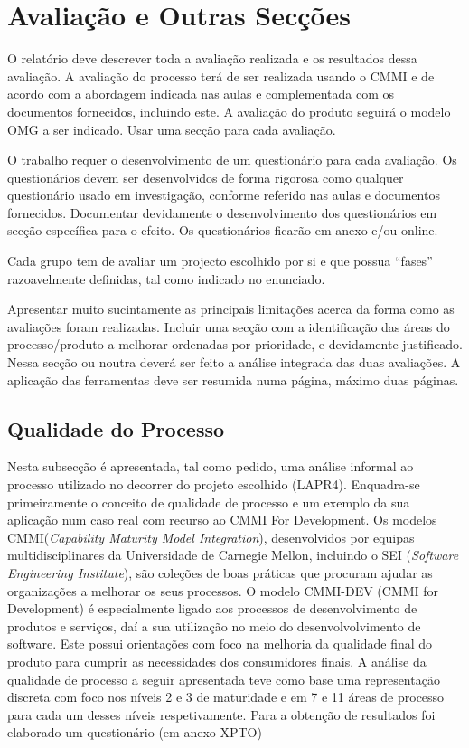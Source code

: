 \documentclass[openany,10pt,a4paper]{article}
\begin{document}
\section{Avaliação e Outras Secções}
O relatório deve descrever toda a avaliação realizada e os resultados dessa avaliação. A avaliação do processo terá de ser realizada usando o CMMI e de acordo com a abordagem indicada nas aulas e complementada com os documentos fornecidos, incluindo este. A avaliação do produto seguirá o modelo OMG a ser indicado. Usar uma secção para cada avaliação.

O trabalho requer o desenvolvimento de um questionário para cada avaliação. Os questionários devem ser desenvolvidos de forma rigorosa como qualquer questionário usado em investigação, conforme referido nas aulas e documentos fornecidos. Documentar devidamente o desenvolvimento dos questionários em secção específica para o efeito. Os questionários ficarão em anexo e/ou online.

Cada grupo tem de avaliar um projecto escolhido por si e que possua “fases” razoavelmente definidas, tal como indicado no enunciado.

Apresentar muito sucintamente as principais limitações acerca da forma como as avaliações foram realizadas. Incluir uma secção com a identificação das áreas do processo/produto a melhorar ordenadas por prioridade, e devidamente justificado. Nessa secção ou noutra deverá ser feito a análise integrada das duas avaliações. A aplicação das ferramentas deve ser resumida numa página, máximo duas páginas.

\subsection{Qualidade do Processo}
Nesta subsecção é apresentada, tal como pedido, uma análise informal ao processo utilizado no decorrer do projeto escolhido (LAPR4). Enquadra-se primeiramente o conceito de qualidade de processo e um exemplo da sua aplicação num caso real com recurso ao CMMI For Development.
Os modelos CMMI(\textit{Capability Maturity Model Integration}), desenvolvidos por equipas multidisciplinares da Universidade de Carnegie Mellon, incluindo o SEI (\textit{Software Engineering Institute}), são coleções de boas práticas que procuram ajudar as organizações a melhorar os seus processos. O modelo CMMI-DEV (CMMI for Development) é especialmente ligado aos processos de desenvolvimento de produtos e serviços, daí a sua utilização no meio do desenvolvolvimento de software. Este possui orientações com foco na melhoria da qualidade final do produto para cumprir as necessidades dos consumidores finais. \cite{CMMIProductTeam2010} 
A análise da qualidade de processo a seguir apresentada teve como base uma representação discreta com foco nos níveis 2 e 3 de maturidade e em 7 e 11 áreas de processo para cada um desses níveis respetivamente. Para a obtenção de resultados foi elaborado um questionário (em anexo XPTO) 
\end{document}
